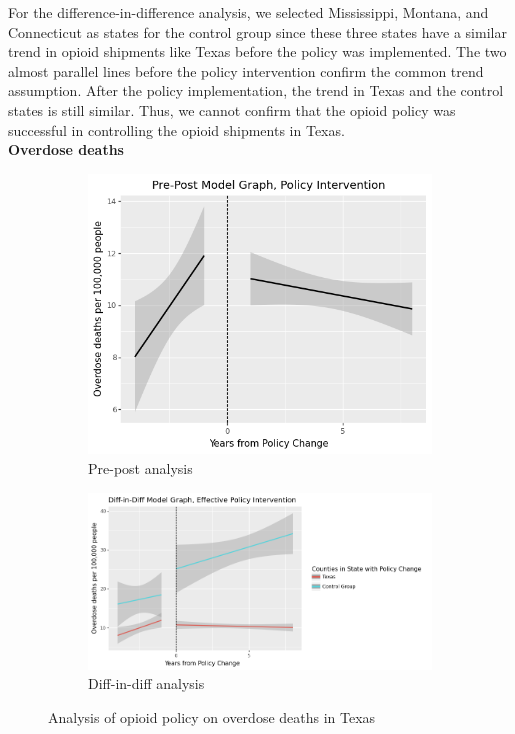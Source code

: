 \documentclass[12pt,letterpaper]{article}
\begin{document}
For the difference-in-difference analysis, we selected Mississippi, Montana, and Connecticut as states for the control group since these three states have a similar trend in opioid shipments like Texas before the policy was implemented. The two almost parallel lines before the policy intervention confirm the common trend assumption. After the policy implementation, the trend in Texas and the control states is still similar. Thus, we cannot confirm that the opioid policy was successful in controlling the opioid shipments in Texas. \\

\noindent \textbf{Overdose deaths}

\begin{figure}[!h]
\centering
\begin{subfigure}{.5\textwidth}
  \centering
  \includegraphics[width=0.7\linewidth]{../30_results/General_Results/texas_overdose_death_prepost.png}
  \caption{Pre-post analysis}
  \label{fig:tx_death_prepost}
\end{subfigure}%
\begin{subfigure}{.55\textwidth}
  \centering
  \includegraphics[width=1\linewidth]{../30_results/General_Results/texas_overdose_death_diffdiff.png}
  \caption{Diff-in-diff analysis}
  \label{fig:tx_death_did}
\end{subfigure}
\caption{Analysis of opioid policy on overdose deaths in Texas}
\label{fig:tx_death}
\end{figure}
\end{document}
